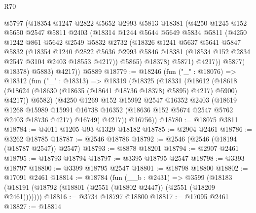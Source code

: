 \begin{lexlean}{R70}
\begin{coremodule}
              @5797
              (@18354
                @1247
                @2822
                @5652
                @2993
                @5813
                @18381
                (@4250
                  @1245
                  @152
                  @5650
                  @2547
                  @5811
                  @2403
                  (@18314
                    @1244
                    @5644
                    @5649
                    @5834
                    @5811
                    (@4250
                      @1242
                      @861
                      @5642
                      @2549
                      @5832
                      @2732
                      (@18326
                        @1241
                        @5637
                        @5641
                        @5847
                        @5832
                        (@18354
                          @1240
                          @2822
                          @5636
                          @2993
                          @5846
                          @18381
                          (@18534 @152 @2834 @2547 @3104 @2403 @18553 @4217))
                        @5865)
                      @18378)
                    @5871)
                  @4217))
              @5877)
            @18378)
          @5883)
        @4217))
    @5889
@18779 := @18246
    (fun ("_" : @18076) =>
    @18312
      (fun ("_" : @18313) =>
      @18319
        (@18325
          (@18331
            (@18612
              (@18618 (@18624 (@18630 (@18635 (@18641 @18736 @18378) @5895) @4217) @5900) @4217))
            @6582)
          (@4250
            @1269
            @152
            @15992
            @2547
            @16352
            @2403
            (@18619
              @1268
              @15989
              @15991
              @16738
              @16352
              (@18636 @152 @5674 @2547 @5762 @2403 @18736 @4217)
              @16749)
            @4217))
        @16756))
@18780 := @18075 @3811
@18784 := @4011 @1205 @93 @1329 @18182
@18785 := @2904 @2461
@18786 := @3262 @18785
@18787 := @2546 @18786
@18792 := @2546 (@2546 (@18194 (@18787 @2547)) @2547)
@18793 := @8878 @18201
@18794 := @2907 @2461
@18795 := @18793 @18794
@18797 := @3395 @18795 @2547
@18798 := @3393 @18797
@18800 := @3399 @18795 @2547
@18801 := @18798 @18800
@18802 := @17091 @2461
@18814 := @18784
    (fun (__b : @2431) =>
    @3599 (@18183 (@18191 (@18792 (@18801 (@2551 (@18802 @2447)) (@2551 (@18209 @2461)))))))
@18816 := @3734 @18797 @18800
@18817 := @17095 @2461
@18827 := @18814

\end{coremodule}
\end{lexlean}
